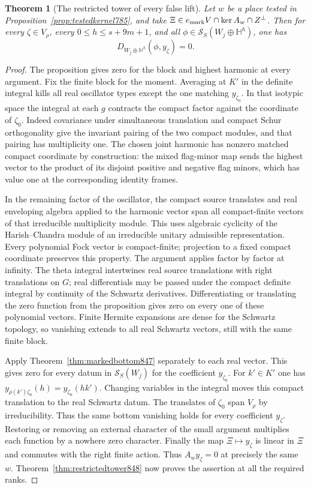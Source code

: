 \documentclass[a4paper,11pt]{article}
\newtheorem{theorem}[proposition]{Theorem}
\theoremstyle{definition}
\theoremstyle{remark}
\numberwithin{equation}{section}
\begin{document}
\begin{theorem}[The restricted tower of every false lift]
\leavevmode\label{thm:falsedescent849}
Let \(w\) be a place tested in Proposition~\ref{prop:testedkernel785},
and take \(\Xi\in e_{\rm mark}V\cap\ker A_w\cap Z^\perp\).
Then for every \(\zeta\in V_\rho\), every \(0\le h\le s+9m+1\),
and all \(\phi\in\mathcal S_S(W_j\oplus\mathbb H^h)\), one has
\[
                    D_{W_j\oplus\mathbb H^h}(\phi,y_\zeta)=0 .
\]
\end{theorem}
\begin{proof}
The proposition gives zero for the block and highest harmonic
at every argument. Fix the finite block for the moment. Averaging
at \(K'\) in the definite integral kills all real oscillator
types except the one matching \(y_{\zeta_0}\). In that isotypic
space the integral at each \(g\) contracts the compact factor
against the coordinate of \(\zeta_0\). Indeed covariance under
simultaneous translation and compact Schur orthogonality give
the invariant pairing of the two compact modules, and that
pairing has multiplicity one. The chosen joint harmonic has
nonzero matched compact coordinate by construction: the mixed
flag-minor map sends the highest vector to the product of its
disjoint positive and negative flag minors, which has value
one at the corresponding identity frames.

In the remaining factor of the oscillator, the compact source
translates and real enveloping algebra applied to the harmonic
vector span all compact-finite vectors of that irreducible
multiplicity module. This uses algebraic cyclicity of the
Harish--Chandra module of an irreducible unitary admissible
representation. Every polynomial Fock vector is compact-finite;
projection to a fixed compact coordinate preserves this
property. The argument applies factor by factor at infinity.
The theta integral intertwines real source translations with
right translations on \(G\); real differentials may be passed
under the compact definite integral by continuity of the
Schwartz derivatives. Differentiating or translating the zero
function from the proposition gives zero on every one of these
polynomial vectors. Finite Hermite expansions are dense for the
Schwartz topology, so vanishing extends to all real Schwartz
vectors, still with the same finite block.

Apply Theorem~\ref{thm:markedbottom847} separately to each real
vector. This gives zero for every datum in \(\mathcal S_S(W_j)\)
for the coefficient \(y_{\zeta_0}\). For \(k'\in K'\) one has
\(y_{\rho(k')\zeta_0}(h)=y_{\zeta_0}(hk')\). Changing variables
in the integral moves this compact translation to the real
Schwartz datum. The translates of \(\zeta_0\) span \(V_\rho\)
by irreducibility. Thus the same bottom vanishing holds for
every coefficient \(y_\zeta\). Restoring or removing an
external character of the small argument multiplies each
function by a nowhere zero character.
Finally the map \(\Xi\mapsto y_\zeta\) is linear in \(\Xi\) and
commutes with the right finite action. Thus \(A_w y_\zeta=0\)
at precisely the same \(w\). Theorem~\ref{thm:restrictedtower848}
now proves the assertion at all the required ranks.
\end{proof}
\clearpage
\end{document}
